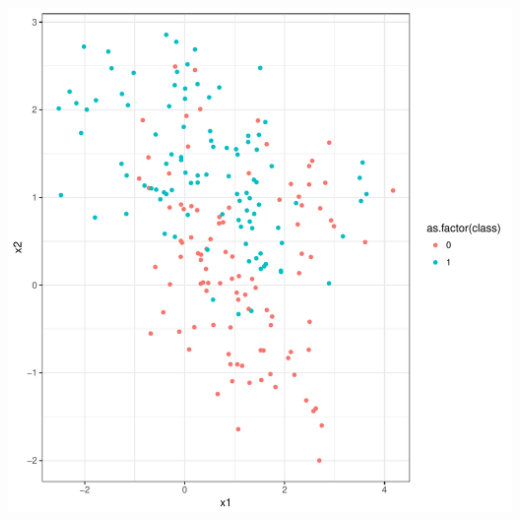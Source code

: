 \documentclass[12pt,oneside]{book}\usepackage[]{graphicx}\usepackage[]{color}
\makeatletter
\def\maxwidth{ %
  \ifdim\Gin@nat@width>\linewidth
    \linewidth
  \else
    \Gin@nat@width
  \fi
}
\newenvironment{knitrout}{}{} %
\makeatother
\begin{document}
{\begin{knitrout}
\includegraphics[width=\maxwidth]{figure/unnamed-chunk-237-1} 


\end{knitrout}}
\end{document}
